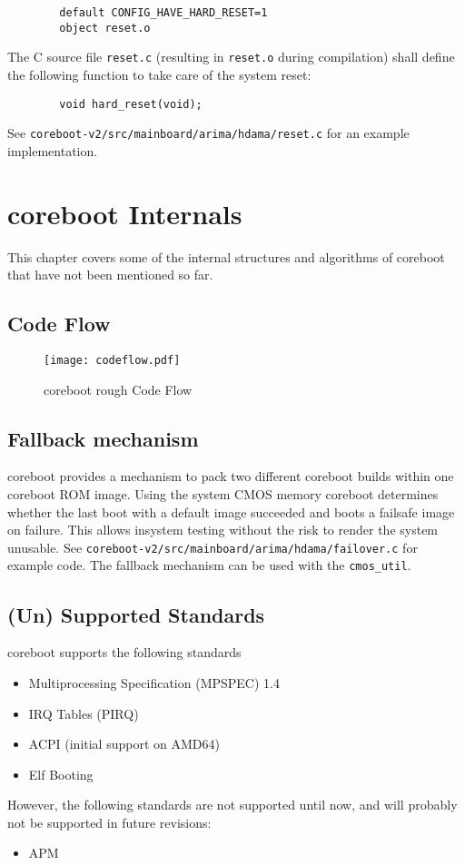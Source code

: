 \documentclass[titlepage,12pt]{article}
\begin{document}
\begin{verbatim}
        default CONFIG_HAVE_HARD_RESET=1
        object reset.o
\end{verbatim}

The C source file \texttt{reset.c} (resulting in \texttt{reset.o}
during compilation) shall define the following function to take care 
of the system reset:

\begin{verbatim}
        void hard_reset(void);
\end{verbatim}

See \texttt{coreboot-v2/src/mainboard/arima/hdama/reset.c} for an example
implementation.

\newpage

%
%

\section{coreboot Internals}
This chapter covers some of the internal structures and algorithms of
coreboot that have not been mentioned so far.

\subsection{Code Flow}

\begin{figure}[htb]
\centering
\texttt{[image: codeflow.pdf]}
\caption{coreboot rough Code Flow}
\label{fix:codeflow}
\end{figure}

\newpage

\subsection{Fallback mechanism}
coreboot provides a mechanism to pack two different coreboot builds
within one coreboot ROM image. Using the system CMOS memory coreboot
determines whether the last boot with a default image succeeded and
boots a failsafe image on failure. This allows insystem testing without
the risk to render the system unusable. See
\texttt{coreboot-v2/src/mainboard/arima/hdama/failover.c} for example
code. The fallback mechanism can be used with the \texttt{cmos\_util}.

\subsection{(Un) Supported Standards}
coreboot supports the following standards
\begin{itemize}
\item Multiprocessing Specification (MPSPEC) 1.4
\item IRQ Tables (PIRQ)
\item ACPI (initial support on AMD64)
\item Elf Booting
\end{itemize}
However, the following standards are not supported until now, and will
probably not be supported in future revisions:
\begin{itemize}
\item APM
\end{itemize}
\end{document}
